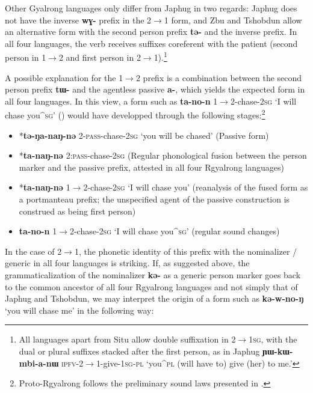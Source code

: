 \documentclass[oldfontcommands,oneside,a4paper,11pt]{article}
\newcommand{\ipa}[1]{\mbox{\phon\textbf{#1}}} %
\begin{document}
Other Gyalrong languages only differ from Japhug in two regards: Japhug does not have the inverse \ipa{wɣ-} prefix in the  2$\rightarrow$1 form, and Zbu and Tshobdun allow an alternative form with the second person prefix \ipa{tə-} and the inverse prefix. In all four languages, the verb receives suffixes coreferent with the patient (second person in 1$\rightarrow$2 and first person in  2$\rightarrow$1).\footnote{All languages apart from Situ allow double suffixation in 2$\rightarrow$\textsc{1sg}, with the dual or plural suffixes stacked after the first person, as in Japhug \ipa{ɲɯ-kɯ-mbi-a-nɯ} \textsc{ipfv}-2$\rightarrow$1-give-\textsc{1sg-pl} `you^{\textsc{pl}} (will have to) give (her) to me.'}


  A possible explanation for the 1$\rightarrow$2  prefix is a combination between the second person prefix \ipa{tɯ-} and the agentless passive \ipa{a-}, which yields the expected form in all four languages. In this view, a form such as \ipa{ta-no-n} 1$\rightarrow$2-chase-\textsc{2sg} `I will chase you^{\textsc{sg}}' (\citealt[219]{linxr93jiarong}) would have developped through the following stages:\footnote{Proto-Rgyalrong follows the preliminary sound laws presented in \citet{jacques04these}.}

\begin{itemize}
\item *\ipa{tə-ŋa-naŋ-nə}  2-\textsc{pass}-chase-\textsc{2sg} `you will be chased' (Passive form)
\item *\ipa{ta-naŋ-nə}  2:\textsc{pass}-chase-\textsc{2sg} (Regular phonological fusion between the person marker and the passive prefix, attested in all four Rgyalrong languages)  
\item  *\ipa{ta-naŋ-nə}  1$\rightarrow$2-chase-\textsc{2sg} `I will chase you' (reanalysis of the fused form as a portmanteau prefix; the unspecified agent of the passive construction is construed as being first person)
\item  \ipa{ta-no-n} 1$\rightarrow$2-chase-\textsc{2sg} `I will chase you^{\textsc{sg}}' (regular sound changes)
\end{itemize}


In the case of 2$\rightarrow$1, the phonetic identity of this prefix with the nominalizer / generic in all four languages is striking. If, as suggested above, the grammaticalization of the nominalizer \ipa{kə-} as a generic person marker goes back to the common ancestor of all four Rgyalrong languages and not simply that of Japhug and Tshobdun, we may interpret the origin of a form such as \ipa{kə-w-no-ŋ} `you will chase me' in the following way:
\end{document}
